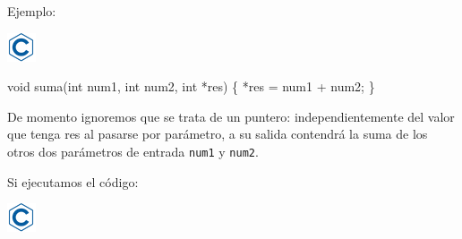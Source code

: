 \documentclass[]{book}
\newenvironment{Shaded}{\begin{snugshade}}{\end{snugshade}}
\newcommand{\DataTypeTok}[1]{\textcolor[rgb]{0.13,0.29,0.53}{#1}}
\newcommand{\DecValTok}[1]{\textcolor[rgb]{0.00,0.00,0.81}{#1}}
\newcommand{\SpecialCharTok}[1]{\textcolor[rgb]{0.00,0.00,0.00}{#1}}
\newcommand{\StringTok}[1]{\textcolor[rgb]{0.31,0.60,0.02}{#1}}
\newcommand{\NormalTok}[1]{#1}
\begin{document}
Ejemplo:

\includegraphics{./img/c.png}

\begin{Shaded}
\begin{Highlighting}[]
\DataTypeTok{void}\NormalTok{ suma(}\DataTypeTok{int}\NormalTok{ num1, }\DataTypeTok{int}\NormalTok{ num2, }\DataTypeTok{int}\NormalTok{ *res) \{}
\NormalTok{    *res = num1 + num2;}
\NormalTok{\}}
\end{Highlighting}
\end{Shaded}

De momento ignoremos que se trata de un puntero: independientemente del
valor que tenga res al pasarse por parámetro, a su salida contendrá la
suma de los otros dos parámetros de entrada \texttt{num1} y
\texttt{num2}.

Si ejecutamos el código:

\includegraphics{./img/c.png}

\begin{Shaded}
\end{Shaded}
\end{document}

